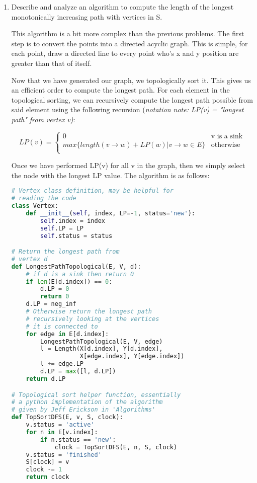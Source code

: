 \documentclass[11pt, letterpaper]{article}
\begin{document}
\begin{enumerate}
\item Describe and analyze an algorithm to compute the length of the longest monotonically increasing path with vertices in S.

\quad This algorithm is a bit more complex than the previous problems. The first step is to convert the points into a directed acyclic graph. This is simple, for each point, draw a directed line to every point who's x and y position are greater than that of itself.

\quad Now that we have generated our graph, we topologically sort it. This gives us an efficient order to compute the longest path. For each element in the topological sorting, we can recursively compute the longest path possible from said element using the following recursion (\textit{notation note: LP(v) = "longest path" from vertex v)}:

\[
LP(v) = 
\begin{cases}
	0 & \text{v is a sink} \\
	max\{ length(v \rightarrow w) + LP(w) | v \rightarrow w \in E \} & \text{otherwise} \\
\end{cases}
\]

Once we have performed LP(v) for all v in the graph, then we simply select the node with the longest LP value. The algorithm is as follows:

\begin{lstlisting}[language=Python]
# Vertex class definition, may be helpful for
# reading the code
class Vertex:
    def __init__(self, index, LP=-1, status='new'):
        self.index = index
        self.LP = LP
        self.status = status

# Return the longest path from 
# vertex d
def LongestPathTopological(E, V, d):
    # if d is a sink then return 0
    if len(E[d.index]) == 0:
        d.LP = 0
        return 0
    d.LP = neg_inf
    # Otherwise return the longest path
    # recursively looking at the vertices
    # it is connected to
    for edge in E[d.index]:
        LongestPathTopological(E, V, edge)
        l = Length(X[d.index], Y[d.index], 
                   X[edge.index], Y[edge.index])
        l += edge.LP
        d.LP = max([l, d.LP])
    return d.LP

# Topological sort helper function, essentially
# a python implementation of the algorithm 
# given by Jeff Erickson in 'Algorithms'
def TopSortDFS(E, v, S, clock):
    v.status = 'active'
    for n in E[v.index]:
        if n.status == 'new':
            clock = TopSortDFS(E, n, S, clock)
    v.status = 'finished'
    S[clock] = v
    clock -= 1
    return clock


\end{lstlisting}
\end{enumerate}
\end{document}
